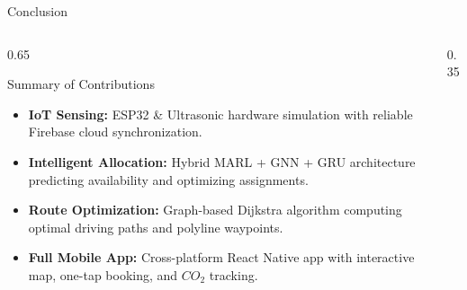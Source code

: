 \documentclass[aspectratio=169]{beamer}
\begin{document}
\begin{frame}{Conclusion}
    \begin{columns}
        \begin{column}{0.65\textwidth}
            \begin{block}{Summary of Contributions}
                \begin{itemize}
                    \item \textbf{IoT Sensing:} ESP32 \& Ultrasonic hardware simulation with reliable Firebase cloud synchronization.
                    \item \textbf{Intelligent Allocation:} Hybrid MARL + GNN + GRU architecture predicting availability and optimizing assignments.
                    \item \textbf{Route Optimization:} Graph-based Dijkstra algorithm computing optimal driving paths and polyline waypoints.
                    \item \textbf{Full Mobile App:} Cross-platform React Native app with interactive map, one-tap booking, and $CO_2$ tracking.
                \end{itemize}
            \end{block}
        \end{column}
        \begin{column}{0.35\textwidth}
            \begin{center}
            \end{center}
        \end{column}
    \end{columns}
\end{frame}
\end{document}
